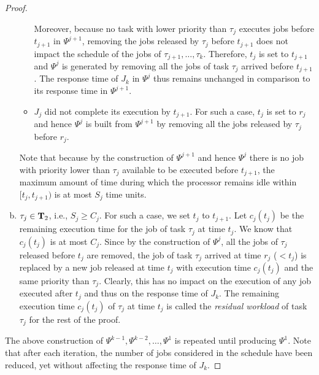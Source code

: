 \begin{proof}
\begin{enumerate}[(a)]
\begin{itemize}
Moreover, because no task with lower priority than $\tau_j$ executes jobs before $t_{j+1}$ in $\Psi^{j+1}$, removing the jobs released by $\tau_j$ before $t_{j+1}$ does not impact the schedule of the jobs of $\tau_{j+1}, \ldots, \tau_{k}$. Therefore, $t_j$ is set to $t_{j+1}$ and $\Psi^j$ is generated by removing all the jobs of task $\tau_j$ arrived before $t_{j+1}$. The response time of $J_{k}$ in $\Psi^j$ thus remains unchanged in comparison to its response time in $\Psi^{j+1}$. 
\item $J_{j}$ did not complete its execution by $t_{j+1}$. For such a case, $t_{j}$ is set to $r_j$ and hence $\Psi^j$ is built from $\Psi^{j+1}$ by removing all the jobs released by $\tau_j$ before $r_j$. 
\end{itemize}
Note that because by the construction of $\Psi^{j+1}$ and hence $\Psi^j$ there is no job with priority lower than $\tau_j$ available to be executed before $t_{j+1}$, the maximum amount of time during which the processor remains idle within $[t_j, t_{j+1})$ is at most $S_j$ time units.
\item $\tau_j \in {\bf T}_2$, i.e., $S_j \geq C_j$. For such a case, we set $t_{j}$ to $t_{j+1}$. Let $c_j(t_j)$ be the remaining execution time for the job of task $\tau_j$ at time $t_j$. We know that $c_j(t_j)$ is at most $C_j$. Since by the construction of $\Psi^j$, all the jobs of $\tau_j$ released before $t_j$ are removed, the job of task $\tau_j$ arrived at time $r_j$ ($< t_j$) is replaced by a new job released at time $t_j$ with execution time $c_j(t_j)$ and the same priority than $\tau_j$. Clearly, this has no impact on the execution of any job executed after $t_j$ and thus on the response time of $J_k$. The remaining execution time $c_j(t_j)$ of $\tau_j$ at time $t_j$ is called the \emph{residual workload} of task $\tau_j$ for the rest of the proof.
\end{enumerate}
 
The above construction of $\Psi^{k-1}, \Psi^{k-2}, \ldots, \Psi^1$ is repeated until producing $\Psi^1$. Note that after each iteration, the number of jobs considered in the schedule have been reduced, yet without affecting the response time of $J_k$. 


\end{proof}
